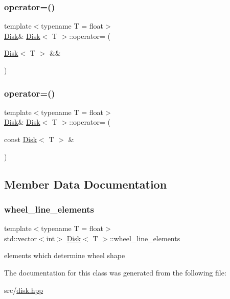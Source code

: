 \subsubsection{\texorpdfstring{operator=()}{operator=()}\hspace{0.1cm}{\footnotesize\ttfamily [1/2]}}
{\footnotesize\ttfamily template$<$typename T  = float$>$ \\
\mbox{\hyperlink{classDisk}{Disk}}\& \mbox{\hyperlink{classDisk}{Disk}}$<$ T $>$\+::operator= (\begin{DoxyParamCaption}\item[{\mbox{\hyperlink{classDisk}{Disk}}$<$ T $>$ \&\&}]{ }\end{DoxyParamCaption})\hspace{0.3cm}{\ttfamily [default]}}

\mbox{\label{classDisk_a3ef862dd6e4671c907e2368bb5239bd2}} 
\subsubsection{\texorpdfstring{operator=()}{operator=()}\hspace{0.1cm}{\footnotesize\ttfamily [2/2]}}
{\footnotesize\ttfamily template$<$typename T  = float$>$ \\
\mbox{\hyperlink{classDisk}{Disk}}\& \mbox{\hyperlink{classDisk}{Disk}}$<$ T $>$\+::operator= (\begin{DoxyParamCaption}\item[{const \mbox{\hyperlink{classDisk}{Disk}}$<$ T $>$ \&}]{ }\end{DoxyParamCaption})\hspace{0.3cm}{\ttfamily [default]}}



\subsection{Member Data Documentation}
\mbox{\label{classDisk_aa008e8bd0e7acdb4a1a56a8f44f048d7}} 
\subsubsection{\texorpdfstring{wheel\+\_\+line\+\_\+elements}{wheel\_line\_elements}}
{\footnotesize\ttfamily template$<$typename T  = float$>$ \\
std\+::vector$<$int$>$ \mbox{\hyperlink{classDisk}{Disk}}$<$ T $>$\+::wheel\+\_\+line\+\_\+elements\hspace{0.3cm}{\ttfamily [private]}}

elements which determine wheel shape 

The documentation for this class was generated from the following file\+:\begin{DoxyCompactItemize}
\item 
src/\mbox{\hyperlink{disk_8hpp}{disk.\+hpp}}\end{DoxyCompactItemize}

